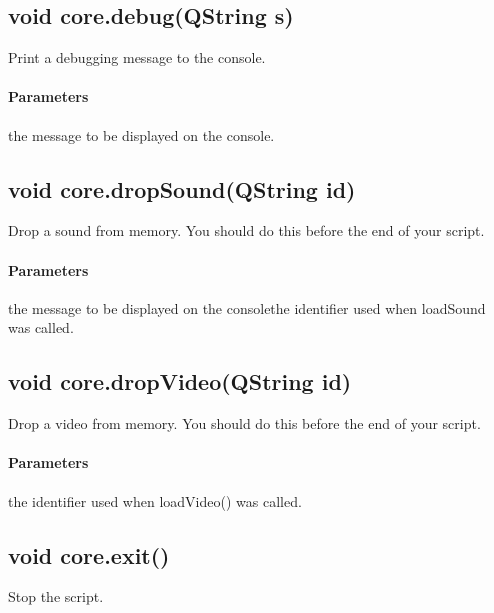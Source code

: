 \subsection{void core.debug(QString s)}
\label{sec:ScriptingAPI:core:debug}
Print a debugging message to the console.

\paragraph{Parameters}
\begin{description}[align=right,labelwidth=3cm,leftmargin=3.2cm]
\item[\parameter{s}] the message to be displayed on the console.
\end{description}

\subsection{void core.dropSound(QString id)}
\label{sec:ScriptingAPI:core:dropSound}
Drop a sound from memory. You should do this before the end of your script.

\paragraph{Parameters}
\begin{description}[align=right,labelwidth=3cm,leftmargin=3.2cm]
\item[\parameter{id}] the message to be displayed on the consolethe identifier used when loadSound was called.
\end{description}

\subsection{void core.dropVideo(QString id)}
\label{sec:ScriptingAPI:core:dropVideo}
Drop a video from memory. You should do this before the end of your script.

\paragraph{Parameters}
\begin{description}[align=right,labelwidth=3cm,leftmargin=3.2cm]
\item[\parameter{id}] the identifier used when loadVideo() was called.
\end{description}

\subsection{void core.exit()}
\label{sec:ScriptingAPI:core:exit}
Stop the script.

